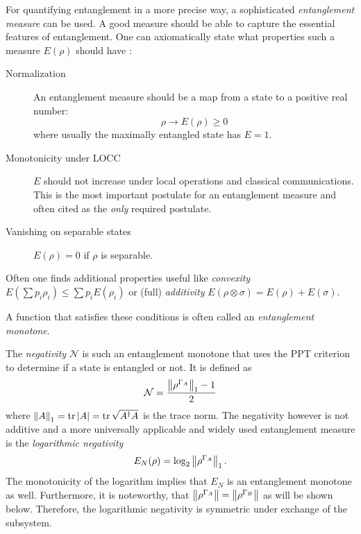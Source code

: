 For quantifying entanglement in a more precise way, a sophisticated \emph{entanglement measure} can be used. A good measure should be able to capture the essential features of entanglement. One can axiomatically state what properties such a measure $E(\rho)$ should have \cite{Plenio_2005a,Horodecki_2009}:
\begin{description}
  \item[Normalization] An entanglement measure should be a map from a state to a positive real number:
  \begin{equation}
    \rho \rightarrow E(\rho) \geq 0
  \end{equation}
  where usually the maximally entangled state has $E=1$.
  \item[Monotonicity under LOCC] $E$ should not increase under local operations and classical communications. This is the most important postulate for an entanglement measure and often cited as the \textit{only} required postulate.
  \item[Vanishing on separable states] $E(\rho)=0$ if $\rho$ is separable.
\end{description}
Often one finds additional properties useful like \textit{convexity} $E(\sum p_i \rho_i) \leq \sum p_i E(\rho_i)$ or (full) \textit{additivity} $E(\rho \otimes \sigma) = E(\rho) + E(\sigma)$.

A function that satisfies these conditions is often called an \textit{entanglement monotone}.

The \emph{negativity} $\mathcal{N}$ is such an entanglement monotone \cite{Vidal_2001,Plenio_2005a} that uses the PPT criterion to determine if a state is entangled or not. It is defined as 
\begin{equation}\label{eq:2:negativity}
  \mathcal{N} = \frac{\left\lVert\rho^{\Gamma_A}\right\rVert_1 - 1}{2}
\end{equation}
where $\left\lVert A\right\rVert_1 = \tr\left\lvert A\right\rvert = \tr \sqrt{A^\dagger A}$ is the trace norm. The negativity however is not additive and a more universally applicable and widely used entanglement measure is the \emph{logarithmic negativity} \cite{Plenio_2005}
\begin{equation}\label{eq:2:logarithmic-negativity}
  E_N(\rho) = \log_2\left\lVert\rho^{\Gamma_A}\right\rVert_1 .
\end{equation}
The monotonicity of the logarithm implies that $E_N$ is an entanglement monotone as well.
Furthermore, it is noteworthy, that $\left\lVert\rho^{\Gamma_A}\right\rVert = \left\lVert\rho^{\Gamma_B}\right\rVert$ as will be shown below. Therefore, the logarithmic negativity is symmetric under exchange of the subsystem.

